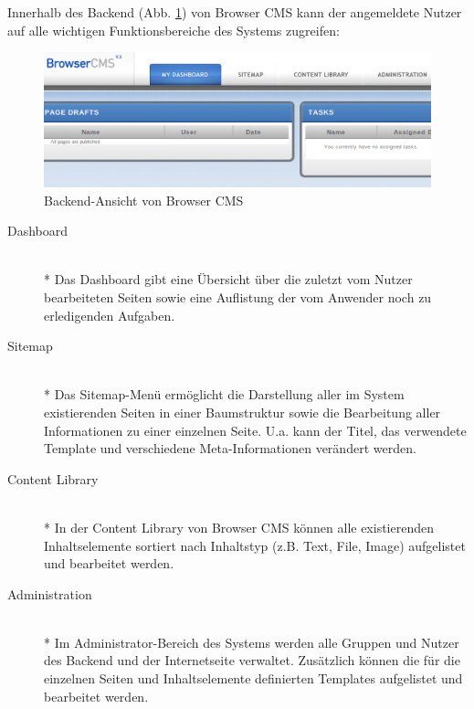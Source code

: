 Innerhalb des Backend (Abb. \ref{browserbackend}) von Browser CMS kann der angemeldete Nutzer auf alle wichtigen Funktionsbereiche des Systems zugreifen:


\begin{figure}[!h]
\begin{center}
\includegraphics[scale=0.42]{images/analyse/browser/backend.png}
\caption{Backend-Ansicht von Browser CMS}
\label{browserbackend}
\end{center}
\end{figure}


\begin{description}
\item[Dashboard]\mbox{~}\\*
Das Dashboard gibt eine Übersicht über die zuletzt vom Nutzer bearbeiteten Seiten sowie eine Auflistung der vom Anwender noch zu erledigenden Aufgaben.
\item[Sitemap]\mbox{~}\\*
Das Sitemap-Menü ermöglicht die Darstellung aller im System existierenden Seiten in einer Baumstruktur sowie die Bearbeitung aller Informationen zu einer einzelnen Seite. U.a. kann der Titel, das verwendete Template und verschiedene Meta-Informationen verändert werden.
\item[Content Library]\mbox{~}\\*
In der Content Library von Browser CMS können alle existierenden Inhaltselemente sortiert nach Inhaltstyp (z.B. Text, File, Image) aufgelistet und bearbeitet werden.
\item[Administration]\mbox{~}\\*
Im Administrator-Bereich des Systems werden alle Gruppen und Nutzer des Backend und der Internetseite verwaltet. Zusätzlich können die für die einzelnen Seiten und Inhaltselemente definierten Templates aufgelistet und bearbeitet werden.
\end{description}

